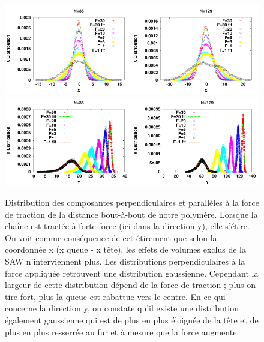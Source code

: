 \documentclass[a4paper,11pt]{article}
\begin{document}
\begin{figure}[H]
\begin{center}
\includegraphics[width=0.5\textwidth]{xdistribution35.pdf}\includegraphics[width=0.5\textwidth]{xdistribution129.pdf}\\
\includegraphics[width=0.5\textwidth]{ydistribution35.pdf}\includegraphics[width=0.5\textwidth]{ydistribution129.pdf}

\caption{Distribution des composantes perpendiculaires et parallèles à la force de traction de la distance bout-à-bout de notre polymère. Lorsque la chaîne est tractée à forte force (ici dans la direction y), elle s'étire. On voit comme conséquence de cet étirement que selon la coordonnée x (x queue - x tête),  les effets de volumes exclus de la SAW n'interviennent plus. Les distributions perpendiculaires à la force appliquée retrouvent une distribution gaussienne. Cependant la largeur de cette distribution dépend de la force de traction ; plus on tire fort, plus la queue est rabattue vers le centre. En ce qui concerne la direction y, on constate qu'il existe une distribution également gaussienne qui est de plus en plus éloignée de la tête et de plus en plus resserrée au fur et à mesure que la force augmente. }
\label{traction}
\end{center}
\end{figure}
\end{document}
